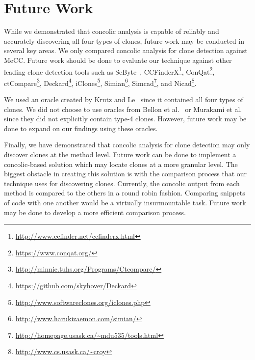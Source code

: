 \documentclass{sig-alternate}
\newif\ifisnopii
\begin{document}
\section{Future Work}
\label{sec: futurework}
While we demonstrated that concolic analysis is capable of reliably and accurately discovering all four types of clones, future work may be conducted in several key areas. We only compared concolic analysis for clone detection against MeCC. Future work should be done to evaluate our technique against other leading clone detection tools such as SeByte~\cite{Keivanloo:2012:JBC:2664398.2664404}, CCFinderX\footnote{\url{http://www.ccfinder.net/ccfinderx.html}}, ConQat\footnote{\url{https://www.conqat.org/}}, ctCompare\footnote{\url{http://minnie.tuhs.org/Programs/Ctcompare/}}, Deckard\footnote{\url{https://github.com/skyhover/Deckard}}, iClones\footnote{\url{http://www.softwareclones.org/iclones.php}}, Simian\footnote{\url{http://www.harukizaemon.com/simian/}}, Simcad\footnote{\url{http://homepage.usask.ca/~mdu535/tools.html}}, and Nicad\footnote{\url{http://www.cs.usask.ca/~croy}}.

We used an oracle created by Krutz and Le~\cite{Krutz:2014:CCO:2597073.2597127} since it contained all four types of clones. We did not choose to use oracles from Bellon et al.~\cite{4288192} or Murakami et al.~\cite{Murakami:2014:DCR:2597073.2597133} since they did not explicitly contain type-4 clones. However, future work may be done to expand on our findings using these oracles.


Finally, we have demonstrated that concolic analysis for clone detection may only discover clones at the method level. Future work can be done to implement a concolic-based solution which may locate clones at a more granular level. The biggest obstacle in creating this solution is with the comparison process that our technique uses for discovering clones. Currently, the concolic output from each method is compared to the others in a round robin fashion. Comparing snippets of code with one another would be a virtually insurmountable task. Future work may be done to develop a more efficient comparison process.
\end{document}

